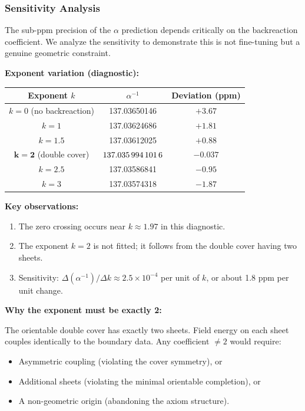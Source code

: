 \subsubsection{Sensitivity Analysis}
\label{sec:sensitivity}

The sub-ppm precision of the $\alpha$ prediction depends critically on the backreaction 
coefficient. We analyze the sensitivity to demonstrate this is not fine-tuning but 
a genuine geometric constraint.

\textbf{Exponent variation (diagnostic):}
\begin{center}
\begin{tabular}{@{}ccc@{}}
\toprule
\textbf{Exponent $k$} & $\alpha^{-1}$ & \textbf{Deviation (ppm)}\\
\midrule
$k = 0$ (no backreaction) & 137.03650146 & $+3.67$\\
$k = 1$ & 137.03624686 & $+1.81$\\
$k = 1.5$ & 137.03612025 & $+0.88$\\
$\mathbf{k = 2}$ (double cover) & $\mathbf{\num[round-mode=places,round-precision=10]{\TFPTalphaInvSelfNum}}$ & $\mathbf{-0.037}$\\
$k = 2.5$ & 137.03586841 & $-0.95$\\
$k = 3$ & 137.03574318 & $-1.87$\\
\bottomrule
\end{tabular}
\end{center}

\textbf{Key observations:}
\begin{enumerate}[leftmargin=1.5em, topsep=2pt, itemsep=1pt]
    \item The zero crossing occurs near $k \approx 1.97$ in this diagnostic.
    \item The exponent $k=2$ is not fitted; it follows from the double cover having two sheets.
    \item Sensitivity: $\Delta(\alpha^{-1})/\Delta k \approx 2.5 \times 10^{-4}$ per unit of $k$, 
        or about 1.8 ppm per unit change.
\end{enumerate}

\textbf{Why the exponent must be exactly 2:}

The orientable double cover has exactly two sheets. Field energy on each sheet couples 
identically to the boundary data. Any coefficient $\neq 2$ would require:
\begin{itemize}[leftmargin=1.5em, topsep=2pt, itemsep=1pt]
    \item Asymmetric coupling (violating the cover symmetry), or
    \item Additional sheets (violating the minimal orientable completion), or
    \item A non-geometric origin (abandoning the axiom structure).
\end{itemize}

